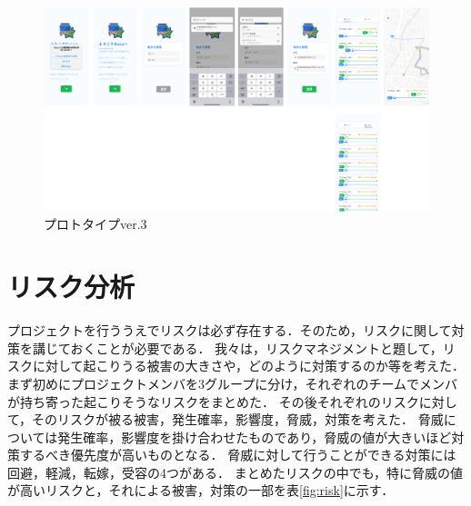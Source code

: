 \begin{figure}[H]
    \centering
    \includegraphics[width=14cm]{images/prototype_v4.png}
    \caption{プロトタイプver.3}
    \label{fig:prototype_v3}
\end{figure}

\section{リスク分析}
プロジェクトを行ううえでリスクは必ず存在する．そのため，リスクに関して対策を講じておくことが必要である．
我々は，リスクマネジメント\cite{risk}と題して，リスクに対して起こりうる被害の大きさや，どのように対策するのか等を考えた．
まず初めにプロジェクトメンバを3グループに分け，それぞれのチームでメンバが持ち寄った起こりそうなリスクをまとめた．
その後それぞれのリスクに対して，そのリスクが被る被害，発生確率，影響度，脅威，対策を考えた．
脅威については発生確率，影響度を掛け合わせたものであり，脅威の値が大きいほど対策するべき優先度が高いものとなる．
脅威に対して行うことができる対策には回避，軽減，転嫁，受容の4つがある．
まとめたリスクの中でも，特に脅威の値が高いリスクと，それによる被害，対策の一部を表\ref{fig:risk}に示す．

